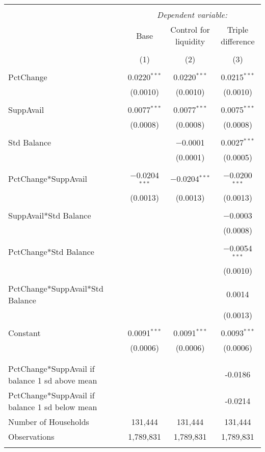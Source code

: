 
\begin{tabular}{@{\extracolsep{5pt}}lccc} 
\\[-1.8ex]\toprule 
\toprule \\[-1.8ex] 
 & \multicolumn{3}{c}{\textit{Dependent variable:}} \\ 
\cmidrule{2-4} 
 & Base & Control for liquidity & Triple difference \\ 
\\[-1.8ex] & (1) & (2) & (3)\\ 
\midrule \\[-1.8ex] 
 PctChange & 0.0220$^{***}$ & 0.0220$^{***}$ & 0.0215$^{***}$ \\ 
  & (0.0010) & (0.0010) & (0.0010) \\ 
  & & & \\ 
 SuppAvail & 0.0077$^{***}$ & 0.0077$^{***}$ & 0.0075$^{***}$ \\ 
  & (0.0008) & (0.0008) & (0.0008) \\ 
  & & & \\ 
 Std Balance &  & $-$0.0001 & 0.0027$^{***}$ \\ 
  &  & (0.0001) & (0.0005) \\ 
  & & & \\ 
 PctChange*SuppAvail & $-$0.0204$^{***}$ & $-$0.0204$^{***}$ & $-$0.0200$^{***}$ \\ 
  & (0.0013) & (0.0013) & (0.0013) \\ 
  & & & \\ 
 SuppAvail*Std Balance &  &  & $-$0.0003 \\ 
  &  &  & (0.0008) \\ 
  & & & \\ 
 PctChange*Std Balance &  &  & $-$0.0054$^{***}$ \\ 
  &  &  & (0.0010) \\ 
  & & & \\ 
 PctChange*SuppAvail*Std Balance &  &  & 0.0014 \\ 
  &  &  & (0.0013) \\ 
  & & & \\ 
 Constant & 0.0091$^{***}$ & 0.0091$^{***}$ & 0.0093$^{***}$ \\ 
  & (0.0006) & (0.0006) & (0.0006) \\ 
  & & & \\ 
\midrule \\[-1.8ex] 
PctChange*SuppAvail if balance 1 sd above mean &  &  & -0.0186 \\ 
PctChange*SuppAvail if balance 1 sd below mean &  &  & -0.0214 \\ 
Number of Households & 131,444 & 131,444 & 131,444 \\ 
Observations & 1,789,831 & 1,789,831 & 1,789,831 \\ 
\bottomrule \\[-1.8ex] 
\end{tabular} 

